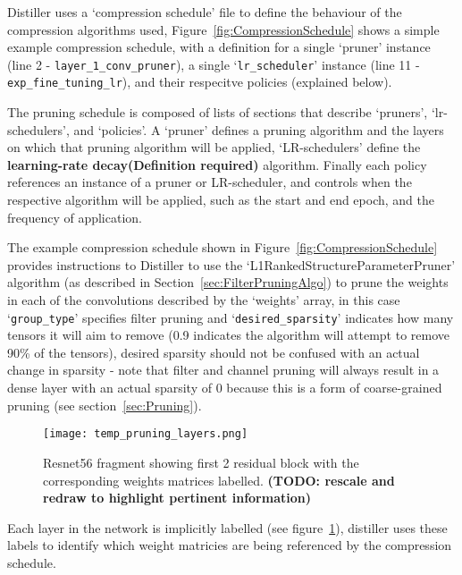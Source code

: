 \documentclass[../Dissertation.tex]{subfiles}
\begin{document}
Distiller uses a `compression schedule' file to define the behaviour of the compression algorithms used, Figure~\ref{fig:CompressionSchedule} shows a simple example compression schedule, with a definition for a single `pruner' instance (line 2 - \texttt{\color{mintedgreen}layer\_1\_conv\_pruner}), a single `\texttt{\color{mintedgreen}lr\_scheduler}' instance (line 11 - \texttt{\color{mintedgreen}exp\_fine\_tuning\_lr}), and their respecitve policies (explained below).


The pruning schedule is composed of lists of sections that describe `{\color{mintedgreen}pruners}', `{\color{mintedgreen}lr-schedulers}', and `{\color{mintedgreen}policies}'. 
A `{\color{mintedgreen}pruner}' defines a pruning algorithm and the layers on which that pruning algorithm will be applied, `LR-schedulers' define the \textbf{learning-rate decay(Definition required)} algorithm. 
Finally each policy references an instance of a pruner or LR-scheduler, and controls when the respective algorithm will be applied, such as the start and end epoch, and the frequency of application.

The example compression schedule shown in Figure~\ref{fig:CompressionSchedule} provides instructions to Distiller to use the `L1RankedStructureParameterPruner' algorithm (as described in Section~\ref{sec:FilterPruningAlgo}) to prune the weights in each of the convolutions described by the `weights' array, in this case `\texttt{\color{mintedgreen}group\_type}' specifies filter pruning and `\texttt{\color{mintedgreen}desired\_sparsity}' indicates how many tensors it will aim to remove (0.9 indicates the algorithm will attempt to remove 90\% of the tensors), desired sparsity should not be confused with an actual change in sparsity - note that filter and channel pruning will always result in a dense layer with an actual sparsity of 0 because this is a form of coarse-grained pruning (see section~\ref{sec:Pruning}).

\begin{figure}[H]
    \texttt{[image: temp\_pruning\_layers.png]}
    \caption{Resnet56 fragment showing first 2 residual block with the corresponding weights matrices labelled. \textbf{(TODO: rescale and redraw to highlight pertinent information)}}
    \label{fig:resnet56weightlabels}
\end{figure}

Each layer in the network is implicitly labelled (see figure~\ref{fig:resnet56weightlabels}), distiller uses these labels to identify which weight matricies are being referenced by the compression schedule. 
\end{document}
